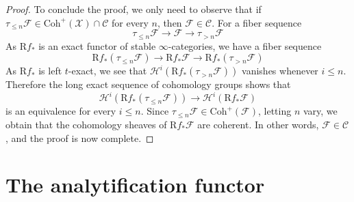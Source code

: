 \documentclass[12pt,a4paper,reqno]{amsart}
\theoremstyle{plain}
\theoremstyle{definition}
\theoremstyle{remark}
\numberwithin{equation}{section}
\begin{document}
\begin{proof}
	To conclude the proof, we only need to observe that if $\tau_{\le n} {\mathcal F} \in {\mathrm{Coh}}^+({\mathcal X}) \cap {\mathcal C}$ for every $n$, then ${\mathcal F} \in {\mathcal C}$.
	For a fiber sequence
	\[ \tau_{\le n} {\mathcal F} \to {\mathcal F} \to \tau_{> n} {\mathcal F} \]
	As ${\mathrm R} f_*$ is an exact functor of stable $\infty$-categories, we have a fiber sequence
	\[ {\mathrm R} f_* (\tau_{\le n} {\mathcal F}) \to {\mathrm R} f_* {\mathcal F} \to {\mathrm R} f_*(\tau_{> n} {\mathcal F}) \]
	As ${\mathrm R} f_*$ is left $t$-exact, we see that ${\mathcal H}^i({\mathrm R} f_*(\tau_{> n} {\mathcal F}))$ vanishes whenever $i \le n$.
	Therefore the long exact sequence of cohomology groups shows that
	\[ {\mathcal H}^i( {\mathrm R} f_*(\tau_{\le n} {\mathcal F}) ) \to {\mathcal H}^i( {\mathrm R} f_* {\mathcal F} ) \]
	is an equivalence for every $i \le n$. Since $\tau_{\le n} {\mathcal F} \in {\mathrm{Coh}}^+({\mathcal F})$, letting $n$ vary, we obtain that the cohomology sheaves of ${\mathrm R} f_* {\mathcal F}$ are coherent. In other words, ${\mathcal F} \in {\mathcal C}$, and the proof is now complete.
\end{proof}

\section{The analytification functor} \label{sec:analytification_functor}
\end{document}
